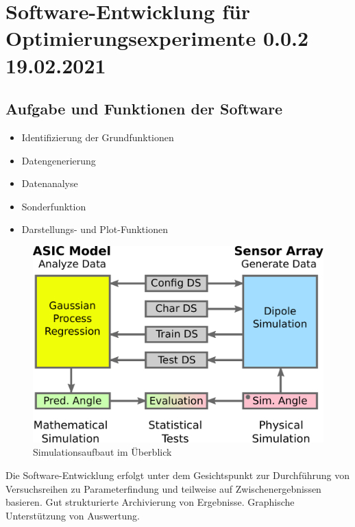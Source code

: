 %

\chapter{Software-Entwicklung für Optimierungsexperimente 0.0.2 19.02.2021}\label{ch:sw-entwicklung-f-opt-exp}

\section{Aufgabe und Funktionen der Software}\label{sec:aufgabe-und-funktionen-sw}
\begin{itemize}
	\item Identifizierung der Grundfunktionen
	\item Datengenerierung
	\item Datenanalyse
	\item Sonderfunktion
	\item Darstellungs- und Plot-Funktionen
\end{itemize}


\begin{figure}[htbp]
	\centering
	\includegraphics[width=0.7\linewidth]{chapters/images/3-SW-E-OExp/Software-Gesamtansicht}
	\caption[Simulationsaufbau im Überblick]{Simulationsaufbaut im Überblick}
	\label{fig:software-gesamtansicht}
\end{figure}



Die Software-Entwicklung erfolgt unter dem Gesichtspunkt zur Durchführung von Versuchsreihen zu 
Parameterfindung und teilweise auf Zwischenergebnissen basieren.
Gut strukturierte Archivierung von Ergebnisse.
Graphische Unterstützung von Auswertung.
 
